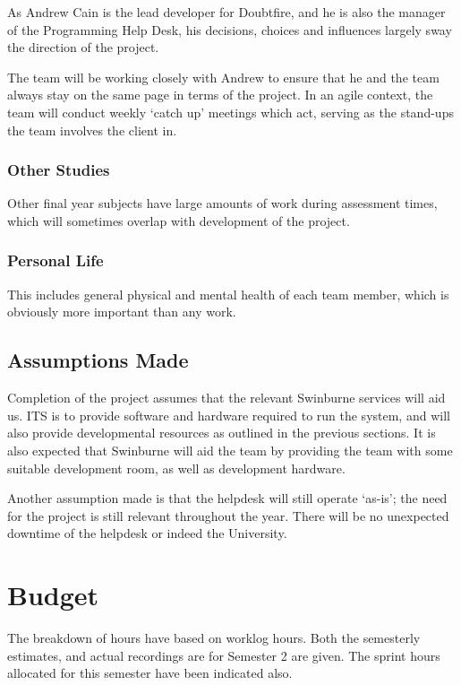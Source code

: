 \documentclass[12pt,a4paper,]{article}
\begin{document}
As Andrew Cain is the lead developer for Doubtfire, and he is also the
manager of the Programming Help Desk, his decisions, choices and
influences largely sway the direction of the project.

The team will be working closely with Andrew to ensure that he and the
team always stay on the same page in terms of the project. In an agile
context, the team will conduct weekly `catch up' meetings which act,
serving as the stand-ups the team involves the client in.

\subsubsection{Other Studies}\label{other-studies}

Other final year subjects have large amounts of work during assessment
times, which will sometimes overlap with development of the project.

\subsubsection{Personal Life}\label{personal-life}

This includes general physical and mental health of each team member,
which is obviously more important than any work.

\subsection{Assumptions Made}\label{assumptions-made}

Completion of the project assumes that the relevant Swinburne services
will aid us. ITS is to provide software and hardware required to run the
system, and will also provide developmental resources as outlined in the
previous sections. It is also expected that Swinburne will aid the team
by providing the team with some suitable development room, as well as
development hardware.

Another assumption made is that the helpdesk will still operate `as-is';
the need for the project is still relevant throughout the year. There
will be no unexpected downtime of the helpdesk or indeed the University.

\section{Budget}\label{budget}

The breakdown of hours have based on worklog hours. Both the semesterly
estimates, and actual recordings are for Semester 2 are given. The
sprint hours allocated for this semester have been indicated also.
\end{document}
